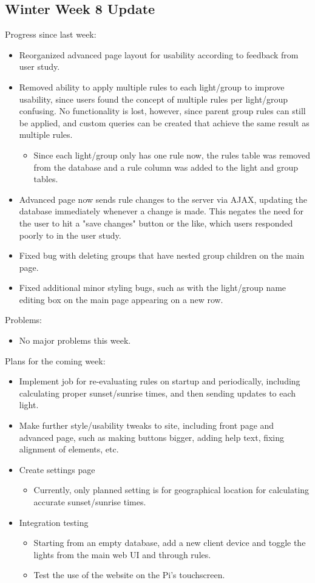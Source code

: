 \subsection{Winter Week 8 Update}
Progress since last week:
\begin{itemize}
   \item Reorganized advanced page layout for usability according to feedback from user study.
   \item Removed ability to apply multiple rules to each light/group to improve usability, since users found the concept of multiple rules per light/group confusing.  No functionality is lost, however, since parent group rules can still be applied, and custom queries can be created that achieve the same result as multiple rules.
      \begin{itemize}
         \item Since each light/group only has one rule now, the rules table was removed from the database and a rule column was added to the light and group tables.
      \end{itemize}
   \item Advanced page now sends rule changes to the server via AJAX, updating the database immediately whenever a change is made.  This negates the need for the user to hit a "save changes" button or the like, which users responded poorly to in the user study.
   \item Fixed bug with deleting groups that have nested group children on the main page.
   \item Fixed additional minor styling bugs, such as with the light/group name editing box on the main page appearing on a new row.
\end{itemize}
Problems:
\begin{itemize}
   \item No major problems this week.
\end{itemize}
Plans for the coming week:
\begin{itemize}
   \item Implement job for re-evaluating rules on startup and periodically, including calculating proper sunset/sunrise times, and then sending updates to each light.
   \item Make further style/usability tweaks to site, including front page and advanced page, such as making buttons bigger, adding help text, fixing alignment of elements, etc.
   \item Create settings page
      \begin{itemize}
         \item Currently, only planned setting is for geographical location for calculating accurate sunset/sunrise times.
      \end{itemize}
   \item Integration testing
      \begin{itemize}
         \item Starting from an empty database, add a new client device and toggle the lights from the main web UI and through rules.
         \item Test the use of the website on the Pi's touchscreen.
      \end{itemize}
\end{itemize}
